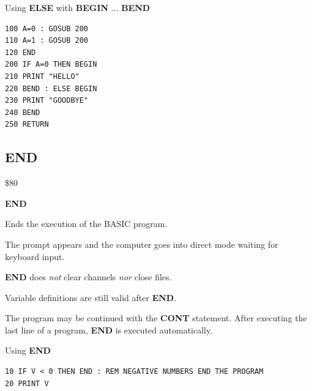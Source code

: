 \begin{description}[leftmargin=2cm,style=nextline]
                  Using {\bf ELSE} with {\bf BEGIN} ... {\bf BEND}

\begin{tcolorbox}[colback=black,coltext=white]
\verbatimfont{\codefont}
\begin{verbatim}
100 A=0 : GOSUB 200
110 A=1 : GOSUB 200
120 END
200 IF A=0 THEN BEGIN
210 PRINT "HELLO"
220 BEND : ELSE BEGIN
230 PRINT "GOODBYE"
240 BEND
250 RETURN
\end{verbatim}
\end{tcolorbox}
\end{description}


\newpage
\subsection{END}
\begin{description}[leftmargin=2cm,style=nextline]
\item [Token:]    \$80

\item [Format:]   {\bf END}

\item [Usage:]    Ends the execution of the BASIC program.

                  The  prompt appears and the computer goes into direct mode waiting for keyboard input.

\item [Remarks:]  {\bf END} does \emph{not} clear channels \emph{nor} close files.

                  Variable definitions are still valid after {\bf END}.

                  The program may be continued with the {\bf CONT} statement. After executing the last line of a program, {\bf END} is executed automatically.

\item [Example:]  Using {\bf END}

\begin{tcolorbox}[colback=black,coltext=white]
\verbatimfont{\codefont}
\begin{verbatim}
10 IF V < 0 THEN END : REM NEGATIVE NUMBERS END THE PROGRAM
20 PRINT V
\end{verbatim}
\end{tcolorbox}
\end{description}


